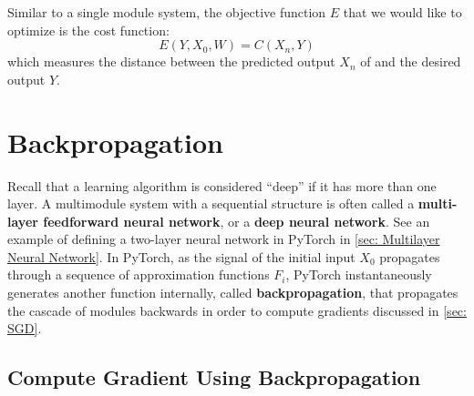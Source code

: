 Similar to a single module system, the objective function $E$ that we would like to optimize is the cost function:
\[
E(Y, X_0, W) = C(X_n, Y)
\]
which measures the distance between the predicted output $X_n$ of and the desired output $Y$. 
\section{Backpropagation}\label{sec: Backpropagation}

Recall that a learning algorithm is considered ``deep'' if it has more than one layer.
A multimodule system with a sequential structure is often called a \textbf{multi-layer feedforward neural network}, or a \textbf{deep neural network}.
See an example of defining a two-layer neural network in PyTorch in \cref{sec: Multilayer Neural Network}.
In PyTorch, as the signal of the initial input $X_0$ propagates through a sequence of approximation functions $F_i$, PyTorch instantaneously generates another function internally, called \textbf{backpropagation}, that propagates the cascade of modules backwards in order to compute gradients discussed in \cref{sec: SGD}. 

\subsection{Compute Gradient Using Backpropagation}\label{ssc: Compute SGD using backprop}

